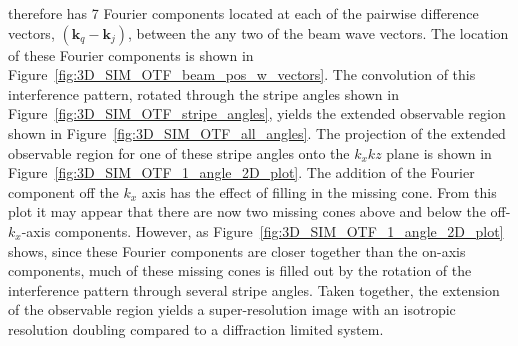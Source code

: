 therefore has 7 Fourier components located at each of the pairwise
difference vectors, $\left(\textbf{k}_{q}-\textbf{k}_{j}\right)$, 
between the any two of the beam wave vectors. The location of these 
Fourier components is shown in 
Figure~\ref{fig:3D_SIM_OTF_beam_pos_w_vectors}. The convolution of 
this interference pattern, rotated through the stripe angles shown
in Figure~\ref{fig:3D_SIM_OTF_stripe_angles}, yields the extended
observable region shown in Figure~\ref{fig:3D_SIM_OTF_all_angles}.
The projection of the extended observable region for one of these 
stripe angles onto the $k_{x}k{z}$ plane is shown in 
Figure~\ref{fig:3D_SIM_OTF_1_angle_2D_plot}. The addition of the
Fourier component off the $k_{x}$ axis has the effect of filling 
in the missing cone. From this plot it may appear that there are
now two missing cones above and below the off-$k_{x}$-axis components.
However, as Figure~\ref{fig:3D_SIM_OTF_1_angle_2D_plot} shows, 
since these Fourier components are closer together than the
on-axis components, much of these missing cones is filled out by 
the rotation of the interference pattern through several stripe
angles. Taken together, the extension of the observable region 
yields a super-resolution image with an isotropic resolution 
doubling compared to a diffraction limited 
system\cite{gustafsson2008three}.

